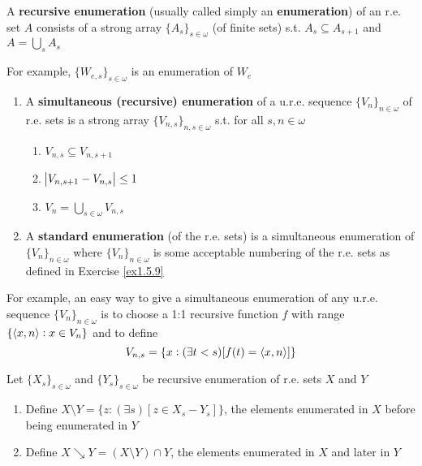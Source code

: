 \documentclass[11pt]{article}
\begin{document}
\begin{definition}[]
A \textbf{recursive enumeration} (usually called simply an \textbf{enumeration}) of an r.e.
set \(A\) consists of a strong array \(\{A_s\}_{s\in\omega}\) (of finite
sets) s.t. \(A_s\subseteq A_{s+1}\) and \(A=\bigcup_s A_s\)
\end{definition}

For example, \(\{W_{e,s}\}_{s\in\omega}\) is an enumeration of \(W_e\)

\begin{definition}[]
\begin{enumerate}
\item A \textbf{simultaneous (recursive) enumeration} of a u.r.e. sequence
\(\{V_n\}_{n\in\omega}\) of r.e. sets is a strong array
\(\{V_{n,s}\}_{n,s\in\omega}\) s.t. for all \(s,n\in\omega\)
\begin{enumerate}
\item \(V_{n,s}\subseteq V_{n,s+1}\)
\item \(\abs{V_{n,s+1}-V_{n,s}}\le1\)
\item \(V_n=\bigcup_{s\in\omega}V_{n,s}\)
\end{enumerate}
\item A \textbf{standard enumeration} (of the r.e. sets) is a simultaneous enumeration
of \(\{V_n\}_{n\in\omega}\) where \(\{V_n\}_{n\in\omega}\) is some
acceptable numbering of the r.e. sets as defined in Exercise \ref{ex1.5.9}
\end{enumerate}
\end{definition}

For example, an easy way to give a simultaneous enumeration of any u.r.e.
sequence \(\{V_n\}_{n\in\omega}\) is to choose a 1:1 recursive function \(f\)
with range \(\{\langle x,n\rangle:x\in V_n\}\) and to define
\begin{equation*}
V_{n,s}=\{x: (\exists t<s)[f(t)=\langle x,n\rangle]\}
\end{equation*}

\begin{definition}[]
Let \(\{X_s\}_{s\in\omega}\) and \(\{Y_s\}_{s\in\omega}\) be recursive
enumeration of r.e. sets \(X\) and \(Y\)
\begin{enumerate}
\item Define \(X\setminus Y=\{z: (\exists s)[z\in X_s-Y_s]\}\), the elements
enumerated in \(X\) before being enumerated in \(Y\)
\item Define \(X\searrow Y=(X\setminus Y)\cap Y\), the elements enumerated in
\(X\) and later in \(Y\)
\end{enumerate}
\end{definition}
\end{document}

